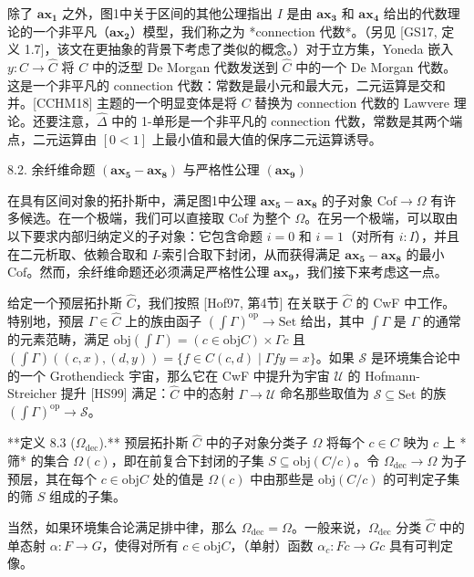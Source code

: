\documentclass{ctexart}
\theoremstyle{plain}
\theoremstyle{definition}
\theoremstyle{definition}
\theoremstyle{definition}
\theoremstyle{definition}
\newcommand{\ax}[1]{\mathbf{ax_{#1}}}
\numberwithin{equation}{section}
\begin{document}
除了 \(\ax{1}\) 之外，图1中关于区间的其他公理指出 \(I\) 是由 \(\ax{3}\) 和 \(\ax{4}\) 给出的代数理论的一个非平凡（\(\ax{2}\)）模型，我们称之为 *connection 代数*。（另见 [GS17, 定义 1.7]，该文在更抽象的背景下考虑了类似的概念。）对于立方集，Yoneda 嵌入 \(y : C \to \hat{C}\) 将 \(C\) 中的泛型 De Morgan 代数发送到 \(\hat{C}\) 中的一个 De Morgan 代数。这是一个非平凡的 connection 代数：常数是最小元和最大元，二元运算是交和并。[CCHM18] 主题的一个明显变体是将 \(C\) 替换为 connection 代数的 Lawvere 理论。还要注意，\(\hat{\Delta}\) 中的 1-单形是一个非平凡的 connection 代数，常数是其两个端点，二元运算由 \([0 < 1]\) 上最小值和最大值的保序二元运算诱导。

8.2. 余纤维命题 \((\ax{5}-\ax{8})\) 与严格性公理 \((\ax{9})\)

在具有区间对象的拓扑斯中，满足图1中公理 \(\ax{5}-\ax{8}\) 的子对象 \(\text{Cof} \to \Omega\) 有许多候选。在一个极端，我们可以直接取 \(\text{Cof}\) 为整个 \(\Omega\)。在另一个极端，可以取由以下要求内部归纳定义的子对象：它包含命题 \(i = 0\) 和 \(i = 1\)（对所有 \(i : I\)），并且在二元析取、依赖合取和 \(I\)-索引合取下封闭，从而获得满足 \(\ax{5}-\ax{8}\) 的最小 \(\text{Cof}\)。然而，余纤维命题还必须满足严格性公理 \(\ax{9}\)，我们接下来考虑这一点。

给定一个预层拓扑斯 \(\hat{C}\)，我们按照 [Hof97, 第4节] 在关联于 \(\hat{C}\) 的 CwF 中工作。特别地，预层 \(\Gamma \in \hat{C}\) 上的族由函子 \((\int \Gamma)^{\text{op}} \to \text{Set}\) 给出，其中 \(\int \Gamma\) 是 \(\Gamma\) 的通常的元素范畴，满足 \(\text{obj}(\int \Gamma) = (c \in \text{obj} C) \times \Gamma c\) 且 \((\int \Gamma)((c,x),(d,y)) = \{f \in C(c,d) \mid \Gamma f y = x\}\)。如果 \(\mathcal{S}\) 是环境集合论中的一个 Grothendieck 宇宙，那么它在 CwF 中提升为宇宙 \(\mathcal{U}\) 的 Hofmann-Streicher 提升 [HS99] 满足：\(\hat{C}\) 中的态射 \(\Gamma \to \mathcal{U}\) 命名那些取值为 \(\mathcal{S} \subseteq \text{Set}\) 的族 \((\int \Gamma)^{\text{op}} \to \mathcal{S}\)。

**定义 8.3 (\(\Omega_{\text{dec}}\)).** 预层拓扑斯 \(\hat{C}\) 中的子对象分类子 \(\Omega\) 将每个 \(c \in C\) 映为 \(c\) 上 *筛* 的集合 \(\Omega(c)\)，即在前复合下封闭的子集 \(S \subseteq \text{obj}(C/c)\)。令 \(\Omega_{\text{dec}} \to \Omega\) 为子预层，其在每个 \(c \in \text{obj} C\) 处的值是 \(\Omega(c)\) 中由那些是 \(\text{obj}(C/c)\) 的可判定子集的筛 \(S\) 组成的子集。

当然，如果环境集合论满足排中律，那么 \(\Omega_{\text{dec}} = \Omega\)。一般来说，\(\Omega_{\text{dec}}\) 分类 \(\hat{C}\) 中的单态射 \(\alpha : F \to G\)，使得对所有 \(c \in \text{obj} C\)，（单射）函数 \(\alpha_c : F c \to G c\) 具有可判定像。
\end{document}
